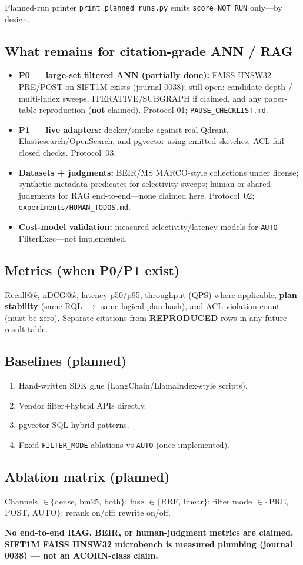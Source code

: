 Planned-run printer \texttt{print\_planned\_runs.py} emits \texttt{score=NOT\_RUN} only---by design.

\subsection{What remains for citation-grade ANN / RAG}
\label{sec:eval-remains}
\begin{itemize}[leftmargin=*]
  \item \textbf{P0 --- large-set filtered ANN (partially done):} FAISS HNSW32 PRE/POST on SIFT1M exists (journal 0038); still open: candidate-depth / multi-index sweeps, ITERATIVE/SUBGRAPH if claimed, and any paper-table reproduction (\textbf{not} claimed). Protocol 01; \texttt{PAUSE\_CHECKLIST.md}.
  \item \textbf{P1 --- live adapters:} docker/smoke against real Qdrant, Elasticsearch/OpenSearch, and pgvector using emitted sketches; ACL fail-closed checks. Protocol~03.
  \item \textbf{Datasets + judgments:} BEIR/MS MARCO-style collections under license; synthetic metadata predicates for selectivity sweeps; human or shared judgments for RAG end-to-end---none claimed here. Protocol~02; \texttt{experiments/HUMAN\_TODOS.md}.
  \item \textbf{Cost-model validation:} measured selectivity/latency models for \texttt{AUTO} FilterExec---not implemented.
\end{itemize}

\subsection{Metrics (when P0/P1 exist)}
Recall@$k$, nDCG@$k$, latency p50/p95, throughput (QPS) where applicable, \textbf{plan stability} (same RQL $\rightarrow$ same logical plan hash), and ACL violation count (must be zero).
Separate \authoronly{} citations from \textbf{REPRODUCED} rows in any future result table.

\subsection{Baselines (planned)}
\begin{enumerate}[leftmargin=*]
  \item Hand-written SDK glue (LangChain/LlamaIndex-style scripts).
  \item Vendor filter+hybrid APIs directly.
  \item pgvector SQL hybrid patterns.
  \item Fixed \texttt{FILTER\_MODE} ablations vs \texttt{AUTO} (once implemented).
\end{enumerate}

\subsection{Ablation matrix (planned)}
Channels $\in\{$dense, bm25, both$\}$; fuse $\in\{$RRF, linear$\}$; filter mode $\in\{$PRE, POST, AUTO$\}$; rerank on/off; rewrite on/off.

\textbf{No end-to-end RAG, BEIR, or human-judgment metrics are claimed.
SIFT1M FAISS HNSW32 microbench is measured plumbing (journal 0038) --- not an ACORN-class claim.}
